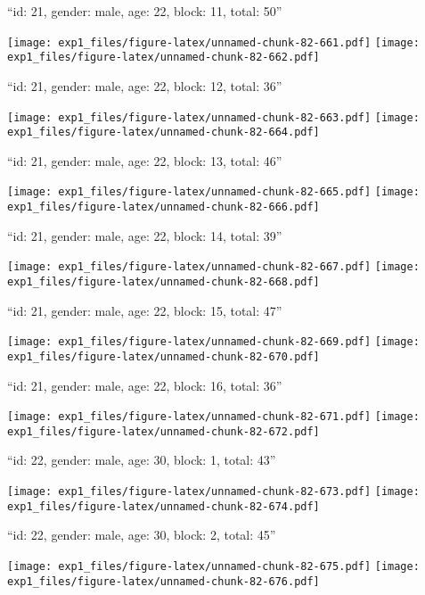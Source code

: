 \documentclass[11pt,,]{article}
\begin{document}
\newpage
[1] 

``id: 21, gender: male, age: 22, block: 11, total: 50''

\texttt{[image: exp1\_files/figure-latex/unnamed-chunk-82-661.pdf]}
\texttt{[image: exp1\_files/figure-latex/unnamed-chunk-82-662.pdf]}

\newpage
[1] 

``id: 21, gender: male, age: 22, block: 12, total: 36''

\texttt{[image: exp1\_files/figure-latex/unnamed-chunk-82-663.pdf]}
\texttt{[image: exp1\_files/figure-latex/unnamed-chunk-82-664.pdf]}

\newpage
[1] 

``id: 21, gender: male, age: 22, block: 13, total: 46''

\texttt{[image: exp1\_files/figure-latex/unnamed-chunk-82-665.pdf]}
\texttt{[image: exp1\_files/figure-latex/unnamed-chunk-82-666.pdf]}

\newpage
[1] 

``id: 21, gender: male, age: 22, block: 14, total: 39''

\texttt{[image: exp1\_files/figure-latex/unnamed-chunk-82-667.pdf]}
\texttt{[image: exp1\_files/figure-latex/unnamed-chunk-82-668.pdf]}

\newpage
[1] 

``id: 21, gender: male, age: 22, block: 15, total: 47''

\texttt{[image: exp1\_files/figure-latex/unnamed-chunk-82-669.pdf]}
\texttt{[image: exp1\_files/figure-latex/unnamed-chunk-82-670.pdf]}

\newpage
[1] 

``id: 21, gender: male, age: 22, block: 16, total: 36''

\texttt{[image: exp1\_files/figure-latex/unnamed-chunk-82-671.pdf]}
\texttt{[image: exp1\_files/figure-latex/unnamed-chunk-82-672.pdf]}

\newpage
[1] 

``id: 22, gender: male, age: 30, block: 1, total: 43''

\texttt{[image: exp1\_files/figure-latex/unnamed-chunk-82-673.pdf]}
\texttt{[image: exp1\_files/figure-latex/unnamed-chunk-82-674.pdf]}

\newpage
[1] 

``id: 22, gender: male, age: 30, block: 2, total: 45''

\texttt{[image: exp1\_files/figure-latex/unnamed-chunk-82-675.pdf]}
\texttt{[image: exp1\_files/figure-latex/unnamed-chunk-82-676.pdf]}
\end{document}
